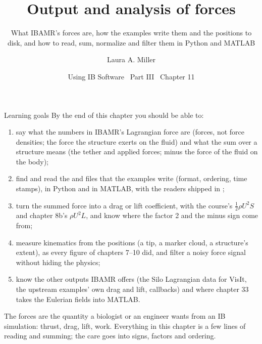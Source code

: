 \documentclass[aspectratio=169,11pt]{beamer}
\title[Output and analysis of forces]{Output and analysis of forces}
\subtitle{What IBAMR's forces are, how the examples write them and the positions to disk, and how to read, sum, normalize and filter them in Python and MATLAB}
\author[Miller]{Laura A. Miller}
\institute[UArizona]{Department of Mathematics, University of Arizona}
\date{Using IB Software \textbullet\ Part III \textbullet\ Chapter 11}
\begin{document}
\begin{frame}[plain]
\end{frame}

\begin{frame}{Learning goals}
\label{fr:goals}
\footnotesize By the end of this chapter you should be able to:
\begin{enumerate}
  \item say what the numbers in IBAMR's Lagrangian force are (forces, not force densities; the force the structure exerts on the fluid) and what the sum over a structure means (the tether and applied forces; minus the force of the fluid on the body);
  \item find and read the  and  files that the examples write (format, ordering, time stamps), in Python and in MATLAB, with the readers shipped in ;
  \item turn the summed force into a drag or lift coefficient, with the course's $\frac12\rho U^2 S$ and chapter 8b's $\rho U^2 L$, and know where the factor 2 and the minus sign come from;
  \item measure kinematics from the positions (a tip, a marker cloud, a structure's extent), as every figure of chapters 7--10 did, and filter a noisy force signal without hiding the physics;
  \item know the other outputs IBAMR offers (the Silo Lagrangian data for VisIt, the upstream examples' own drag and lift, callbacks) and where chapter 33 takes the Eulerian fields into MATLAB.
\end{enumerate}
\begin{punchbox}
\footnotesize The forces are the quantity a biologist or an engineer wants from an IB simulation: thrust, drag, lift, work. Everything in this chapter is a few lines of reading and summing; the care goes into signs, factors and ordering.
\end{punchbox}
\end{frame}
\end{document}
